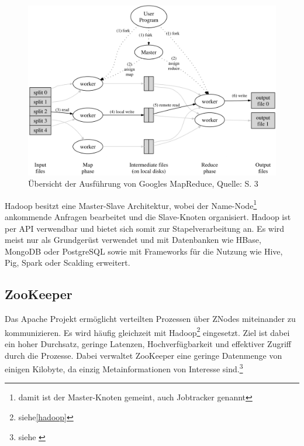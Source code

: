 \begin{figure}[h]
\centering
\includegraphics[width=\textwidth]{Abbildungen/mapreduce.png}
\caption[Übersicht der Ausführung von Googles MapReduce]{Übersicht der Ausführung von Googles MapReduce, Quelle: \cite{paper:mapreduce} S. 3}
\label{fig:mapreduce}
\end{figure}

Hadoop besitzt eine Master-Slave Architektur, wobei der Name-Node\footnote{damit ist der Master-Knoten gemeint, auch Jobtracker genannt} ankommende Anfragen bearbeitet und die Slave-Knoten organisiert.
Hadoop ist per API verwendbar und bietet sich somit zur Stapelverarbeitung an. %
Es wird meist nur als Grundgerüst verwendet und mit Datenbanken wie HBase, MongoDB oder PostgreSQL sowie mit Frameworks für die Nutzung wie Hive, Pig, Spark oder Scalding erweitert.


\subsection{ZooKeeper}
\label{zookeeper}
Das Apache Projekt  ermöglicht verteilten Prozessen über ZNodes miteinander zu kommunizieren.
Es wird häufig gleichzeit mit Hadoop\footnote{siehe\ref{hadoop}} eingesetzt.
Ziel ist dabei ein hoher Durchsatz, geringe Latenzen, Hochverfügbarkeit und effektiver Zugriff durch die Prozesse.
Dabei verwaltet ZooKeeper eine geringe Datenmenge von einigen Kilobyte, da einzig Metainformationen von Interesse sind.\footnote{siehe \cite{website:zookeeper}} 




